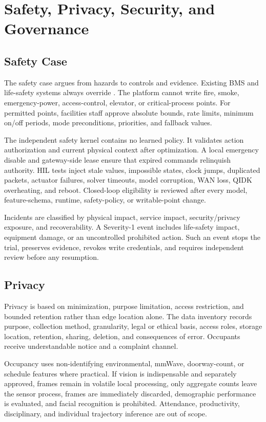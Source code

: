 \section{Safety, Privacy, Security, and Governance}

\subsection{Safety Case}

The safety case argues from hazards to controls and evidence. Existing BMS and life-safety systems always override \system{}. The platform cannot write fire, smoke, emergency-power, access-control, elevator, or critical-process points. For permitted points, facilities staff approve absolute bounds, rate limits, minimum on/off periods, mode preconditions, priorities, and fallback values.

The independent safety kernel contains no learned policy. It validates action authorization and current physical context after optimization. A local emergency disable and gateway-side lease ensure that expired commands relinquish authority. HIL tests inject stale values, impossible states, clock jumps, duplicated packets, actuator failures, solver timeouts, model corruption, WAN loss, QIDK overheating, and reboot. Closed-loop eligibility is reviewed after every model, feature-schema, runtime, safety-policy, or writable-point change.

Incidents are classified by physical impact, service impact, security/privacy exposure, and recoverability. A Severity-1 event includes life-safety impact, equipment damage, or an uncontrolled prohibited action. Such an event stops the trial, preserves evidence, revokes write credentials, and requires independent review before any resumption.

\subsection{Privacy}

Privacy is based on minimization, purpose limitation, access restriction, and bounded retention rather than edge location alone. The data inventory records purpose, collection method, granularity, legal or ethical basis, access roles, storage location, retention, sharing, deletion, and consequences of error. Occupants receive understandable notice and a complaint channel.

Occupancy uses non-identifying environmental, mmWave, doorway-count, or schedule features where practical. If vision is indispensable and separately approved, frames remain in volatile local processing, only aggregate counts leave the sensor process, frames are immediately discarded, demographic performance is evaluated, and facial recognition is prohibited. Attendance, productivity, disciplinary, and individual trajectory inference are out of scope.

